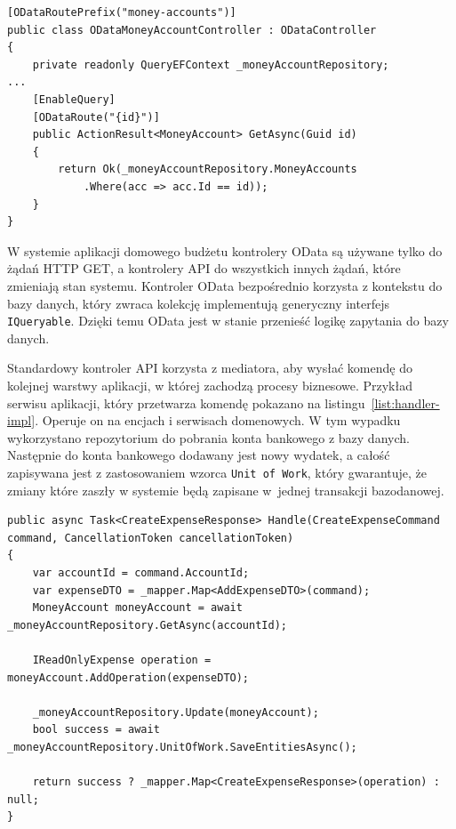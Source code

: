 {\belowcaptionskip=-10pt
\begin{lstlisting}[label=list:odata-ctrl-1,
    caption=Przykład implementacji kontrolera OData]
[ODataRoutePrefix("money-accounts")]
public class ODataMoneyAccountController : ODataController
{
    private readonly QueryEFContext _moneyAccountRepository;
...
    [EnableQuery]
    [ODataRoute("{id}")]
    public ActionResult<MoneyAccount> GetAsync(Guid id)
    {
        return Ok(_moneyAccountRepository.MoneyAccounts
            .Where(acc => acc.Id == id));
    }
}
\end{lstlisting}
}

W systemie aplikacji domowego budżetu kontrolery OData są używane tylko do żądań HTTP GET, a kontrolery API do wszystkich innych żądań, które zmieniają stan systemu.
Kontroler OData bezpośrednio korzysta z kontekstu do bazy danych, który zwraca kolekcję implementują generyczny interfejs \texttt{IQueryable}. Dzięki temu OData jest w stanie przenieść logikę zapytania do bazy danych.

Standardowy kontroler API korzysta z mediatora, aby wysłać komendę do kolejnej warstwy aplikacji, w której zachodzą procesy biznesowe. Przykład serwisu aplikacji, który przetwarza komendę pokazano na listingu~\ref{list:handler-impl}. Operuje on na encjach i serwisach domenowych. W tym wypadku wykorzystano repozytorium do pobrania konta bankowego z bazy danych. Następnie do konta bankowego dodawany jest nowy wydatek, a całość zapisywana jest z zastosowaniem wzorca \texttt{Unit of Work}, który gwarantuje, że zmiany które zaszły w systemie będą zapisane w~jednej transakcji bazodanowej. 

{\belowcaptionskip=-10pt
\begin{lstlisting}[label=list:handler-impl,
    caption=Przykład implementacji handlera aplikacji]
public async Task<CreateExpenseResponse> Handle(CreateExpenseCommand command, CancellationToken cancellationToken)
{
    var accountId = command.AccountId;
    var expenseDTO = _mapper.Map<AddExpenseDTO>(command);
    MoneyAccount moneyAccount = await _moneyAccountRepository.GetAsync(accountId);

    IReadOnlyExpense operation = moneyAccount.AddOperation(expenseDTO);

    _moneyAccountRepository.Update(moneyAccount);
    bool success = await _moneyAccountRepository.UnitOfWork.SaveEntitiesAsync();

    return success ? _mapper.Map<CreateExpenseResponse>(operation) : null;
}
\end{lstlisting}
}

